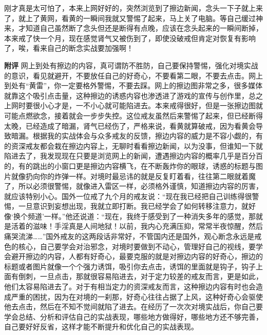 \begin{case}
    刚才真是太可怕了，本来上网好好的，突然浏览到了擦边新闻，念头一下子就上来了，就上了黄网，看黄的一瞬间我就又警惕了起来，马上关了电脑。等自己缓过神来，才知道自己虽然断了念头但还是断得有点晚，应该在念头起来的一瞬间断掉，本来戒了快一个月，现在感觉肾气又被伤到了，即使没破戒但肯定对恢复有影响了，唉，看来自己的断念实战要加强啊！

    \textbf{附评} 网上到处有擦边的内容，真可谓防不胜防，自己要保持警惕，强化对境实战的意识，看见就避开，不要放任自己的好奇心，不要看第二眼，不要去点击。网上到处有“黄雷”，你一定要格外警惕，不要去踩。网上的擦边图非常之多，很多媒体就靠这个吸引点击量，这种擦边的诱惑内容也渗透进了游戏的宣传与创作里，总之上网时要很小心才是，一不小心就可能陷进去。本来戒得很好，但是一张擦边图就可能点燃欲念，接着就会一步步失控。这位戒友虽然后来警惕了起来，但已经断得太晚，已经造成了暗漏，肾气已经伤了，严格来说，看黄就算破戒，因为看黄会导致暗漏。根据我的实战体会与众多戒友的反馈，擦边内容的威力是不容小觑的，有的资深戒友都会栽在擦边内容上，无聊时看看擦边新闻，以为没事，但谁知一下就陷进去了，我发现现在只要是浏览网上的新闻，遭遇擦边内容的概率几乎是百分百的，有的跳出的小窗口更是擦边内容横飞，在不断轰炸你的眼球，诱惑的标题与图片就像扔向你的炸弹一样。对境时最忌讳的就是反复盯着看，往往第二眼就着魔了，所以必须很警惕，就像进入雷区一样，必须格外谨慎，知道擦边内容的厉害，就应该特别小心。国外一位戒了九个月的戒友说：“现在我已经把自己训练得很警惕，一旦意识到妄想出现，我就立即打断。我已经学会了如何转移注意力，就好像‘换个频道’一样。”他还说道：“现在，我终于感受到了一种消失多年的感觉，那就是活着的滋味！手淫真是人间地狱！以前，我内心充满压抑，常常半夜惊醒，然后痛哭流涕……”国外戒友的这两段话非常好，不管国内还是国外，观心断念永远是戒色的核心，自己要学会对治邪念，对境时要做到不动心，管理好自己的视线，要学会避开擦边的内容，人都有好奇心，最要克服的就是对擦边内容的好奇心，擦边的标题或者图片就像一个个强力诱饵，吸引你去点击，诱饵的里面就是钩子，钩子上面有倒刺，一旦点击，那就很容易陷进去，对于定力较差的戒友而言，更是如此，他们太容易陷进去了。对于有相当定力的资深戒友而言，这种擦边内容有时也会造成严重的困扰，因为在对境的一刹那，好奇心往往占据了上风，这种好奇心会驱使他去点击，然后在不知不觉间就陷了进去。在经历了一次次对境实战后，你自己要学会总结、分析和评估自己的实战表现，哪些地方做得好，哪些地方还不够完善，自己要好好反省，这样才能不断提升和优化自己的实战表现。
\end{case}

